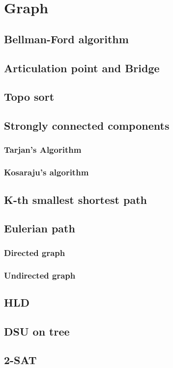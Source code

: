 \section{Graph}

\subsection{Bellman-Ford algorithm}

\subsection{Articulation point and Bridge}

\subsection{Topo sort}

\subsection{Strongly connected components}
  \subsubsection{Tarjan's Algorithm}
  \subsubsection{Kosaraju's algorithm}

\subsection{K-th smallest shortest path}

\subsection{Eulerian path}
  \subsubsection{Directed graph}

  \subsubsection{Undirected graph}

\subsection{HLD}

\subsection{DSU on tree}

\subsection{2-SAT}
